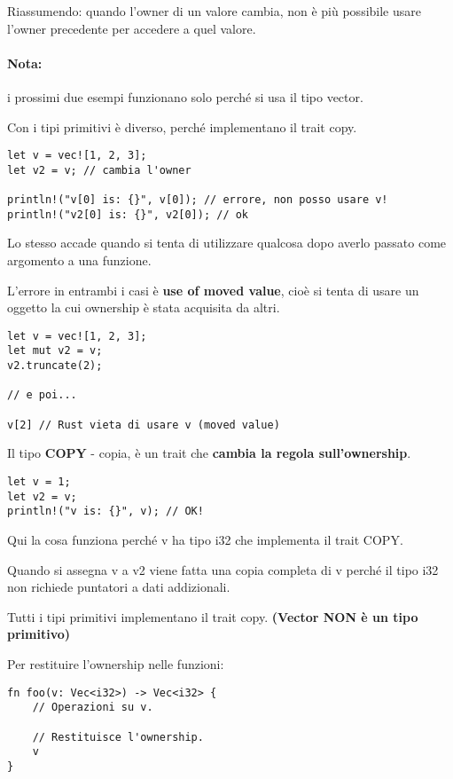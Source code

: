 Riassumendo: quando l'owner di un valore cambia, non è più possibile usare
l'owner precedente per accedere a quel valore.

\paragraph{Nota:} i prossimi due esempi funzionano solo perché si usa
il tipo vector.

Con i tipi primitivi è diverso, perché implementano il trait copy.

\begin{lstlisting}
let v = vec![1, 2, 3];
let v2 = v; // cambia l'owner

println!("v[0] is: {}", v[0]); // errore, non posso usare v!
println!("v2[0] is: {}", v2[0]); // ok
\end{lstlisting}

Lo stesso accade quando si tenta di utilizzare qualcosa dopo averlo passato come
argomento a una funzione.

L'errore in entrambi i casi è \textbf{use of moved value}, cioè si tenta di
usare un oggetto la cui ownership è stata acquisita da altri.

\begin{lstlisting}
let v = vec![1, 2, 3];
let mut v2 = v;
v2.truncate(2);

// e poi...

v[2] // Rust vieta di usare v (moved value)
\end{lstlisting}

Il tipo \textbf{COPY} - copia, è un trait che \textbf{cambia la regola
sull'ownership}.

\begin{lstlisting}
let v = 1;
let v2 = v;
println!("v is: {}", v); // OK!
\end{lstlisting}

Qui la cosa funziona perché v ha tipo i32 che implementa il trait COPY.

Quando si assegna v a v2 viene fatta una copia completa di v perché il tipo
i32 non richiede puntatori a dati addizionali.

Tutti i tipi primitivi implementano il trait copy.
\textbf{(Vector NON è un tipo primitivo)}

Per restituire l'ownership nelle funzioni:

\begin{lstlisting}
fn foo(v: Vec<i32>) -> Vec<i32> {
    // Operazioni su v.

    // Restituisce l'ownership.
    v
}
\end{lstlisting}

